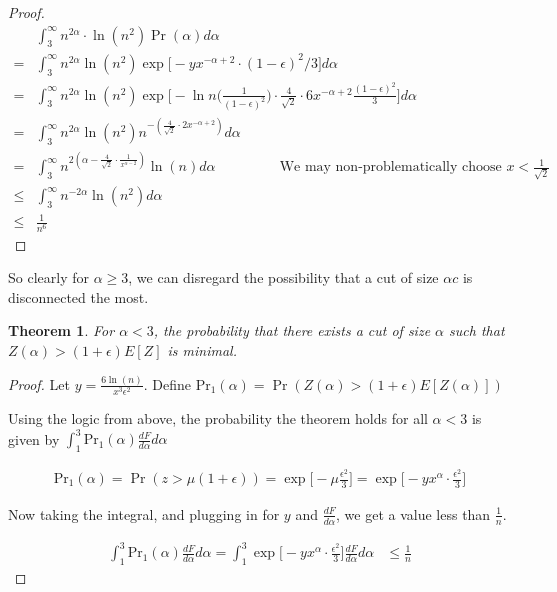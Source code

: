 \documentclass[12pt]{article}
\newtheorem{theorem}{Theorem}
\begin{document}
\begin{proof}
\begin{align*}
&\int_{3}^\infty n^{2\alpha}\cdot \ln{(n^2)} \Pr(\alpha) d\alpha \\
= &\int_{3}^\infty n^{2\alpha} \ln{(n^2)} \exp \bigg[-y x^{-\alpha + 2} \cdot (1-\epsilon)^2/3 \bigg] d\alpha \\
= &\int_{3}^\infty n^{2\alpha} \ln{(n^2)} \exp \bigg[-\ln{n}\bigg(\frac{1}{(1-\epsilon)^2}\bigg) \cdot \frac{4}{\sqrt{2}} \cdot 6x^{-\alpha + 2} \frac{(1-\epsilon)^2}{3} \bigg] d\alpha \\
= &\int_{3}^\infty n^{2\alpha} \ln{(n^2)} n^{-(\frac{4}{\sqrt{2}} \cdot 2x^{-\alpha + 2})} d\alpha \\
= &\int_{3}^\infty n^{2 (\alpha - \frac{4}{\sqrt{2}} \cdot \frac{1}{x^{\alpha-2}})} \ln{(n)}  d\alpha \hspace{55pt} \text{We may non-problematically choose } x < \frac{1}{\sqrt{2}} \\
\leq &\int_{3}^\infty n^{-2\alpha} \ln{(n^2)} d\alpha \\
\leq &\frac{1}{n^6}
\end{align*}
\end{proof}

So clearly for $\alpha \geq 3$, we can disregard the possibility that a cut of size $\alpha c$ is disconnected the most.

\begin{theorem}
For $\alpha < 3$, the probability that there exists a cut of size $\alpha$  such that $Z(\alpha) > (1+\epsilon) E[Z]$ is minimal. 
\end{theorem}

\begin{proof}
Let $y = \frac{6 \ln(n)}{x^3 \epsilon^2}$. Define $\text{Pr}_1(\alpha) = \Pr(Z(\alpha) > (1+\epsilon) E[Z(\alpha)])$

Using the logic from above, the probability the theorem holds for all $\alpha < 3$ is given by $\int_{1}^3 \text{Pr}_1(\alpha) \frac{dF}{d \alpha} d\alpha$

\begin{align*}
\text{Pr}_1(\alpha) = \Pr(z > \mu(1 + \epsilon)) = \exp \bigg[ -\mu \frac{\epsilon^2}{3}\bigg] = \exp \bigg[-y x^\alpha \cdot \frac{\epsilon^2}{3} \bigg]
\end{align*}

Now taking the integral, and plugging in for $y$ and $\frac{dF}{d \alpha}$, we get a value less than $\frac{1}{n}$.

\begin{align*}
\int_{1}^3 \text{Pr}_1(\alpha) \frac{dF}{d \alpha} d\alpha = \int_{1}^3 \exp \bigg[-y x^\alpha \cdot \frac{\epsilon^2}{3} \bigg] \frac{dF}{d \alpha} d\alpha &\leq \frac{1}{n}
\end{align*}

\end{proof}
\end{document}
